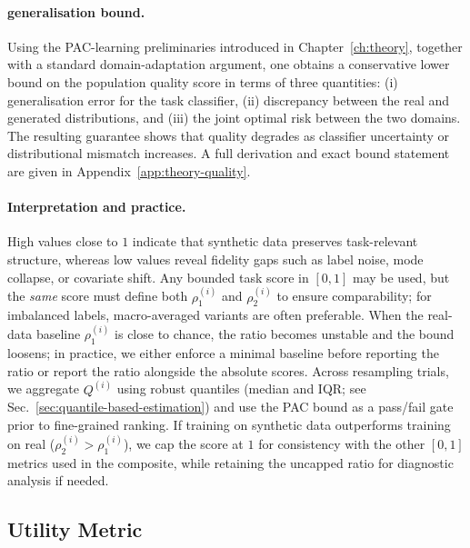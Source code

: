 \paragraph{generalisation bound.}
Using the PAC-learning preliminaries introduced in Chapter~\ref{ch:theory},
together with a standard domain-adaptation argument, one obtains a conservative
lower bound on the population quality score in terms of three quantities:
(i) generalisation error for the task classifier, (ii) discrepancy between the
real and generated distributions, and (iii) the joint optimal risk between the
two domains. The resulting guarantee shows that quality degrades as classifier
uncertainty or distributional mismatch increases. A full derivation and exact
bound statement are given in Appendix~\ref{app:theory-quality}.

\paragraph{Interpretation and practice.}
High values close to $1$ indicate that synthetic data preserves task-relevant
structure, whereas low values reveal fidelity gaps such as label noise, mode
collapse, or covariate shift. Any bounded task score in $[0,1]$ may be used,
but the \emph{same} score must define both $\rho^{(i)}_1$ and $\rho^{(i)}_2$ to
ensure comparability; for imbalanced labels, macro-averaged variants are often
preferable. When the real-data baseline $\rho^{(i)}_1$ is close to chance, the
ratio becomes unstable and the bound loosens; in practice, we either enforce a
minimal baseline before reporting the ratio or report the ratio alongside the
absolute scores. Across resampling trials, we aggregate $Q^{(i)}$ using robust
quantiles (median and IQR; see Sec.~\ref{sec:quantile-based-estimation}) and
use the PAC bound as a pass/fail gate prior to fine-grained ranking. If
training on synthetic data outperforms training on real
($\rho^{(i)}_2>\rho^{(i)}_1$), we cap the score at $1$ for consistency with the
other $[0,1]$ metrics used in the composite, while retaining the uncapped ratio
for diagnostic analysis if needed.


\subsection{Utility Metric}
\label{sec:utility}

